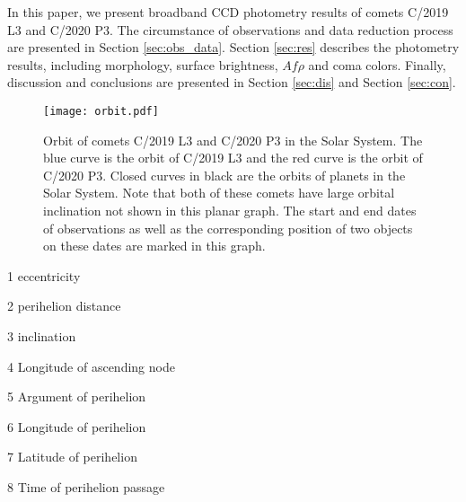 In this paper, we present broadband CCD photometry results of comets C/2019 L3 and C/2020 P3. The circumstance of observations and data reduction process are presented in Section \ref{sec:obs_data}. Section \ref{sec:res} describes the photometry results, including morphology, surface brightness, $Af\rho$ and coma colors. Finally, discussion and conclusions are presented in Section \ref{sec:dis} and Section \ref {sec:con}. 

\begin{figure}
    \centering
    \texttt{[image: orbit.pdf]}
    \caption{Orbit of comets C/2019 L3 and C/2020 P3 in the Solar System. The blue curve is the orbit of C/2019 L3 and the red curve is the orbit of C/2020 P3. Closed curves in black are the orbits of planets in the Solar System. Note that both of these comets have large orbital inclination not shown in this planar graph. The start and end dates of observations as well as the corresponding position of two objects on these dates are marked in this graph. }
    \label{fig:orbit}
\end{figure}

\begin{table}
    \centering
    \caption{Orbital elements of comets C/2019 L3 and C/2020 P3 (Epoch: ). }\label{tab:orb_elem}
    \begin{threeparttable}
        \begin{tablenotes}
            \item[1] eccentricity 
            \item[2] perihelion distance
            \item[3] inclination
            \item[4] Longitude of ascending node
            \item[5] Argument of perihelion
            \item[6] Longitude of perihelion
            \item[7] Latitude of perihelion
            \item[8] Time of perihelion passage
        \end{tablenotes}
    \end{threeparttable}
\end{table}
